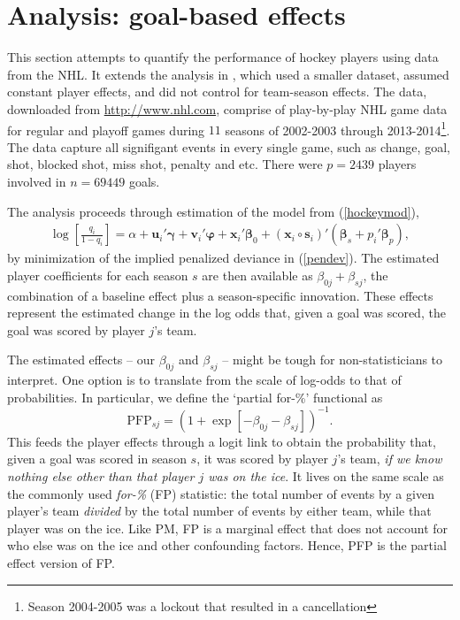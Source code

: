 \section{Analysis: goal-based effects}
\label{sec:goals}



This section attempts to quantify the performance of hockey players using data
from the NHL. It extends the analysis in \cite{gramacy:jensen:taddy:2013}, which used
a smaller dataset, assumed constant player effects, and did not control for
team-season effects. The data, downloaded from \url{http://www.nhl.com},
comprise of play-by-play NHL game data for regular and playoff games during
$11$ seasons of 2002-2003 through 2013-2014\footnote{Season 2004-2005 was a
lockout that resulted in a cancellation}. The data capture all signifigant
events in every single game, such as change, goal, shot, blocked shot, miss
shot, penalty and etc. There were $p=2439$ players involved in $n=69449$
goals.


The analysis proceeds through estimation of the model from (\ref{hockeymod}),
\begin{align*}
\log\left[\frac{q_{i}}{1-q_{i}}\right] = \alpha + \mathbf{u}_i'\boldsymbol{\gamma} +
\mathbf{v}_i'\boldsymbol{\varphi} + \mathbf{x}_i'\boldsymbol{\beta}_0 +
(\mathbf{x}_i\circ\mathbf{s}_i)'(\boldsymbol{\beta}_s +
p_i'\boldsymbol{\beta}_{p}), \end{align*} by minimization of the implied
penalized deviance in (\ref{pendev}). The estimated player coefficients for
each season $s$ are then available as $\beta_{0j} + \beta_{sj}$,  the
combination of a  baseline effect plus a season-specific innovation.  These
effects represent the estimated change in the log odds that, given a goal was
scored, the goal was scored by player $j$'s team.


The estimated effects -- our $\beta_{0j}$ and $\beta_{sj}$ -- might be tough for
non-statisticians to interpret. One option is to translate from the scale of
log-odds to that of probabilities. In particular, we define the `partial for-\%' functional as
\begin{equation}\label{eq:pfp}
\text{PFP}_{sj} = \left(1 + \exp[-\beta_{0j} - \beta_{sj}]\right)^{-1}.
\end{equation}
This feeds the player effects through a logit link  to obtain  the
probability that, given a goal was scored in season $s$, it was scored by
player $j$'s team, {\it if we know nothing else other than that player $j$ was
on the ice}. It lives on the same scale as the commonly used \textit{for-\%}
(FP) statistic: the total number of events by a given player's team
\textit{divided} by the total number of events by either team, while that
player was on the ice.   Like PM, FP is a marginal effect that does not
account for who else was on the ice and other confounding factors.  Hence, PFP
is the partial effect version of FP.


